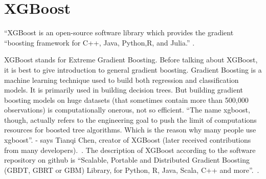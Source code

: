 \section{XGBoost} 

``XGBoost is an open-source software library which provides the
gradient “boosting framework for C++, Java, Python,R, and Julia.''
\cite{hid-sp18-401-XGBoost-wiki}.

XGBoost stands for Extreme Gradient Boosting. Before talking about
XGBoost, it is best to give introduction to general gradient
boosting. Gradient Boosting is a machine learning technique used to
build both regression and classification models. It is primarily used
in building decision trees. But building gradient boosting models on
huge datasets (that sometimes contain more than 500,000 observations)
is computationally onerous, not so efficient.  ``The name xgboost,
though, actually refers to the engineering goal to push the limit of
computations resources for boosted tree algorithms. Which is the
reason why many people use xgboost''.  - says Tianqi Chen, creator of
XGBoost (later received contributions from many
developers).~\cite{hid-sp18-401-XGBoost-gen}. The description of
XGBoost according to the software repository on github is ``Scalable,
Portable and Distributed Gradient Boosting (GBDT, GBRT or GBM)
Library, for Python, R, Java, Scala, C++ and
more''.~\cite{hid-sp18-401-XGBoost-git}.
